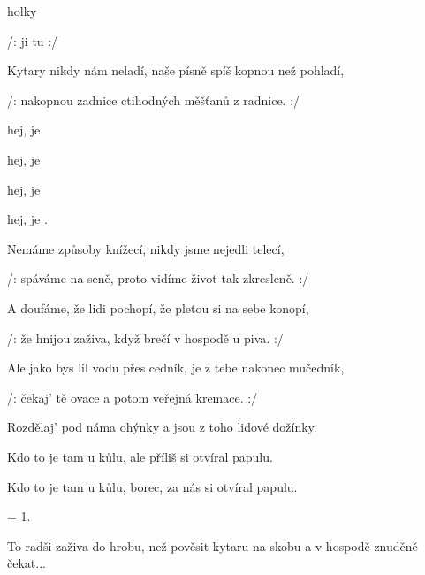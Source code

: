 

\zs
{}  
  holky 

/:  ji 
 tu   :/
\ks

\zs
Kytary nikdy nám neladí,
naše písně spíš kopnou než pohladí,

/: nakopnou zadnice
ctihodných měšťanů z radnice. :/
\ks

\zr
{} hej, je    

 hej, je   

 hej, je   

 hej, je    .
\kr

\zs
Nemáme způsoby knížecí,
nikdy jsme nejedli telecí,

/: spáváme na seně,
proto vidíme život tak zkresleně. :/
\ks

\zs
A doufáme, že lidi pochopí,
že pletou si na sebe konopí,

/: že hnijou zaživa,
když brečí v hospodě u piva. :/
\ks

\zr  \kr

\zs
Ale jako bys lil vodu přes cedník,
je z tebe nakonec mučedník,

/: čekaj' tě ovace
a potom veřejná kremace. :/
\ks

\zs
Rozdělaj' pod náma ohýnky
a jsou z toho lidové dožínky.

Kdo to je tam u kůlu,
ale příliš si otvíral papulu.

Kdo to je tam u kůlu,
borec, za nás si otvíral papulu.
\ks

\zr  \kr

\zs
= 1.
\ks

\zs
To radši zaživa do hrobu,
než pověsit kytaru na skobu
a v hospodě znuděně čekat...
\ks

